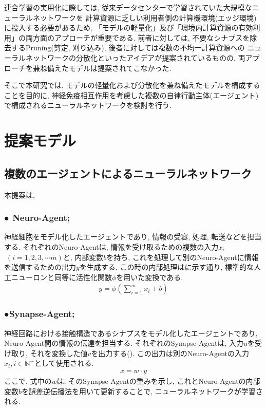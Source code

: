\documentclass[a4paper, 9pt,twocolumn,dvipdfmx]{jsarticle}
\begin{document}
連合学習の実用化に際しては, 従来データセンターで学習されていた大規模なニューラルネットワークを
計算資源に乏しい利用者側の計算機環境(エッジ環境)に投入する必要があるため,  
「モデルの軽量化」及び「環境内計算資源の有効利用」の両方面のアプローチが重要である.
前者に対しては, 不要なシナプスを除去するPruning(剪定, 刈り込み), 
後者に対しては複数の不均一計算資源への
ニューラルネットワークの分散化といったアイデアが提案されているものの, 
両アプローチを兼ね備えたモデルは提案されてこなかった.

そこで本研究では, モデルの軽量化および分散化を兼ね備えたモデルを構成することを目的に, 
神経免疫相互作用を考慮した複数の自律行動主体(エージェント)で構成されるニューラルネットワークを検討を行う.
\section{提案モデル}
\subsection{複数のエージェントによるニューラルネットワーク}
本提案は, 
\vspace{2mm}
  \subsubsection*{● Neuro-Agent;\,\,}
  神経細胞をモデル化したエージェントであり, 情報の受容, 処理, 
  転送などを担当する.
  それぞれのNeuro-Agentは, 情報を受け取るための複数の入力$x_i$ $\;(i= 1, 2, 3, \cdots m)$と, 
  内部変数$b$を持ち, 
  これを処理して別のNeuro-Agentに情報を送信するための出力$y$を生成する.
  この時の内部処理はに示す通り, 
  標準的な人工ニューロンと同等に活性化関数$\phi$を用いた変換である.
  \begin{align}
    y=\phi(\sum_{i=1}^m x_i+b)
    \label{eq:Neuro-Agent}
  \end{align}
  \subsubsection*{●Synapse-Agent;\,\,}
  神経回路における接触構造であるシナプスをモデル化したエージェントであり, 
  Neuro-Agent間の情報の伝達を担当する.
  それぞれのSynapse-Agentは, 入力$u$を受け取り, それを変換した値$v$を出力する(). 
  この出力は別のNeuro-Agentの入力$x_i, i\in\mathbb{N}^+$として使用される.
  \begin{align}
    x=w\cdot y
 \label{eq:Synapse-Agent}   
  \end{align}
  ここで, 式中の$w$は, そのSynapse-Agentの重みを示し, 
  これとNeuro-Agentの内部変数$b$を誤差逆伝播法を用いて更新することで, ニューラルネットワークが学習される.
  \vspace{2mm}
\end{document}
